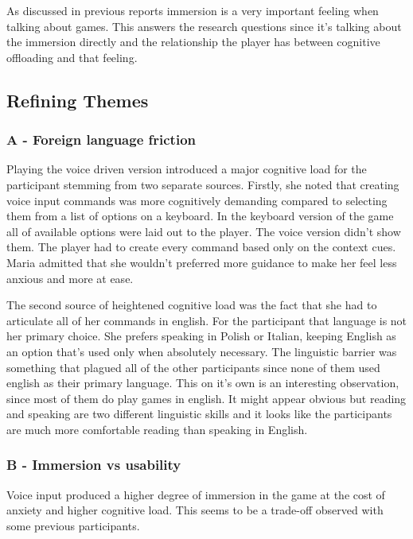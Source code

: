 As discussed in previous reports immersion is a very important feeling when talking about games. This answers the research questions since it's talking about the immersion directly and the relationship the player has between cognitive offloading and that feeling. 



\subsection{Refining Themes}

\subsubsection{A - Foreign language friction}

Playing the voice driven version introduced a major cognitive load for the participant stemming from two separate sources. 
Firstly, she noted that creating voice input commands was more cognitively demanding compared to selecting them from a list of options on a keyboard. In the keyboard version of the game all of available options were laid out to the player. The voice version didn't show them. The player had to create every command based only on the context cues. Maria admitted that she wouldn't preferred more guidance to make her feel less anxious and more at ease. 

The second source of heightened cognitive load was the fact that she had to articulate all of her commands in english. For the participant that language is not her primary choice. She prefers speaking in Polish or Italian, keeping English as an option that's used only when absolutely necessary. The linguistic barrier was something that plagued all of the other participants since none of them used english as their primary language. This on it's own is an interesting observation, since most of them do play games in english. It might appear obvious but reading and speaking are two different linguistic skills and it looks like the participants are much more comfortable reading than speaking in English.


\subsubsection{B - Immersion vs usability}

Voice input produced a higher degree of immersion in the game at the cost of anxiety and higher cognitive load. This seems to be a trade-off observed with some previous participants.

